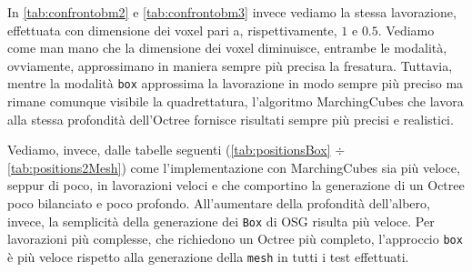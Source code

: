 In \ref{tab:confrontobm2} e \ref{tab:confrontobm3} invece vediamo la stessa lavorazione, effettuata con dimensione dei voxel pari a, rispettivamente, $1$ e $0.5$. Vediamo come man mano che la dimensione dei voxel diminuisce, entrambe le modalità, ovviamente, approssimano in maniera sempre più precisa la fresatura. Tuttavia, mentre la modalità \texttt{box} approssima la lavorazione in modo sempre più preciso ma rimane comunque visibile la quadrettatura, l'algoritmo MarchingCubes che lavora alla stessa profondità dell'Octree fornisce risultati sempre più precisi e realistici.

Vediamo, invece, dalle tabelle seguenti (\ref{tab:positionsBox} $\div$ \ref{tab:positions2Mesh}) come l'implementazione con MarchingCubes sia più veloce, seppur di poco, in lavorazioni veloci e che comportino la generazione di un Octree poco bilanciato e poco profondo. All'aumentare della profondità dell'albero, invece, la semplicità della generazione dei \texttt{Box} di OSG risulta più veloce. Per lavorazioni più complesse, che richiedono un Octree più completo, l'approccio \texttt{box} è più veloce rispetto alla generazione della \texttt{mesh} in tutti i test effettuati.

